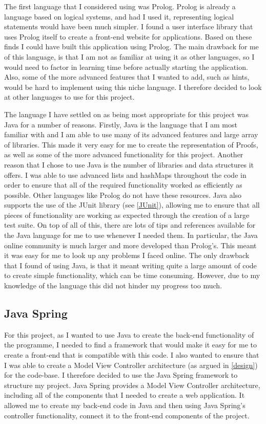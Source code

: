 The first language that I considered using was Prolog. Prolog is already a language based on logical systems, and had I used it, representing logical statements would have been much simpler. I found a user interface library that uses Prolog itself to create a front-end website for applications. Based on these finds I could have built this application using Prolog. The main drawback for me of this language, is that I am not as familiar at using it as other languages, so I would need to factor in learning time before actually starting the application. Also, some of the more advanced features that I wanted to add, such as hints, would be hard to implement using this niche language. I therefore decided to look at other languages to use for this project. 

The language I have settled on as being most appropriate for this project was Java for a number of reasons. Firstly, Java is the language that I am most familiar with and I am able to use many of its advanced features and large array of libraries. This made it very easy for me to create the representation of Proofs, as well as some of the more advanced functionality for this project. Another reason that I chose to use Java is the number of libraries and data structures it offers. I was able to use advanced lists and hashMaps throughout the code in order to ensure that all of the required functionality worked as efficiently as possible. Other languages like Prolog do not have these resources. Java also supports the use of the JUnit library (see \ref{JUnit}), allowing me to ensure that all pieces of functionality are working as expected through the creation of a large test suite. On top of all of this, there are lots of tips and references available for the Java language for me to use whenever I needed them. In particular, the Java online community is much larger and more developed than Prolog's. This meant it was easy for me to look up any problems I faced online. The only drawback that I found of using Java, is that it meant writing quite a large amount of code to create simple functionality, which can be time consuming. However, due to my knowledge of the language this did not hinder my progress too much. 


\subsection{Java Spring \label{JavaSpring}}

For this project, as I wanted to use Java to create the back-end functionality of the programme, I needed to find a framework that would make it easy for me to create a front-end that is compatible with this code. I also wanted to ensure that I was able to create a Model View Controller architecture (as argued in \ref{design}) for the code-base. I therefore decided to use the Java Spring framework to structure my project. Java Spring provides a Model View Controller architecture, including all of the components that I needed to create a web application. It allowed me to create my back-end code in Java and then using Java Spring's controller functionality, connect it to the front-end components of the project. 

